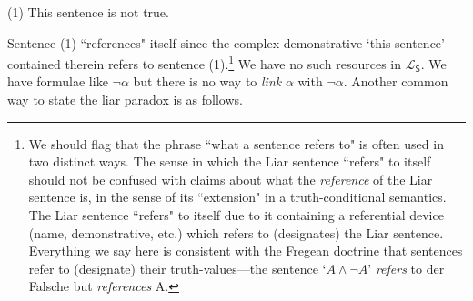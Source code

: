 \documentclass[12pt]{kluwer}
\theoremstyle{remark}
\newcommand{\fancy}[1]{\mathcal{#1}}
\def\S{\textsf{S}}
\def\L{\fancy{L}}
\begin{document}
\begin{center}
(1) This sentence is not true.\\
\end{center}

Sentence (1) ``references" itself since the complex demonstrative `this sentence' contained therein refers to sentence (1).\footnote{We should flag that the phrase ``what a sentence refers to" is often used in two distinct ways. The sense in which the Liar sentence ``refers" to itself should not be confused with claims about what the \textit{reference} of the Liar sentence is, in the sense of its ``extension" in a truth-conditional semantics. The Liar sentence ``refers" to itself due to it containing a referential device (name, demonstrative, etc.) which refers to (designates) the Liar sentence. Everything we say here is consistent with the Fregean doctrine that sentences refer to (designate) their truth-values---the sentence `$A \wedge \neg A$' \textit{refers} to der Falsche but \textit{references} A.}  We have no such resources in $\L_\S$. We have formulae like $\neg\alpha$ but there is no way to \textit{link} $\alpha$ with $\neg\alpha$. Another common way to state the liar paradox is as follows.
\end{document}
